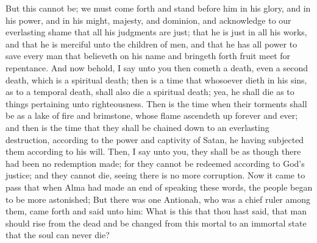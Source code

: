But this cannot be; we must come forth and stand before him in his glory, and in his power, and in his might, majesty, and dominion, and acknowledge to our everlasting shame that all his judgments are just; that he is just in all his works, and that he is merciful unto the children of men, and that he has all power to save every man that believeth on his name and bringeth forth fruit meet for repentance.
\bverse \iffalse And now behold, I say unto you then cometh a death, even a second death, which is a spiritual death; then is a time that whosoever dieth in his sins, as to a temporal death, shall also die a spiritual death; yea, he shall die as to things pertaining unto righteousness. \fi
And now behold, I say unto you then cometh a death, even a second death, which is a spiritual death; then is a time that whosoever dieth in his sins, as to a temporal death, shall also die a spiritual death; yea, he shall die as to things pertaining unto righteousness.
\bverse \iffalse Then is the time when their torments shall be as a lake of fire and brimstone, whose flame ascendeth up forever and ever; and then is the time that they shall be chained down to an everlasting destruction, according to the power and captivity of Satan, he having subjected them according to his will. \fi
Then is the time when their torments shall be as a lake of fire and brimstone, whose flame ascendeth up forever and ever; and then is the time that they shall be chained down to an everlasting destruction, according to the power and captivity of Satan, he having subjected them according to his will.
\bverse \iffalse Then, I say unto you, they shall be as though there had been no redemption made; for they cannot be redeemed according to God's justice; and they cannot die, seeing there is no more corruption. \fi
Then, I say unto you, they shall be as though there had been no redemption made; for they cannot be redeemed according to God's justice; and they cannot die, seeing there is no more corruption.
\bverse \iffalse Now it came to pass that when Alma had made an end of speaking these words, the people began to be more astonished; \fi
Now it came to pass that when Alma had made an end of speaking these words, the people began to be more astonished;
\bverse \iffalse But there was one Antionah, who was a chief ruler among them, came forth and said unto him: What is this that thou hast said, that man should rise from the dead and be changed from this mortal to an immortal state that the soul can never die? \fi
But there was one Antionah, who was a chief ruler among them, came forth and said unto him: What is this that thou hast said, that man should rise from the dead and be changed from this mortal to an immortal state that the soul can never die?

